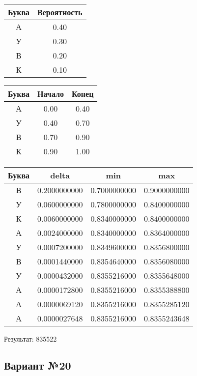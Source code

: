 \documentclass[a4paper, 12pt]{article}
\begin{document}
\begin{center}
 \begin{tabular}{ |c|c| } 
  \hline
     Буква & Вероятность \\ \hline
А & 0.40\\\hline
У & 0.30\\\hline
В & 0.20\\\hline
К & 0.10
\\ \hline \end{tabular}
\end{center}
\begin{center}
 \begin{tabular}{ |c|c|c| } 
  \hline
     Буква & Начало & Конец \\ \hline
А & 0.00 & 0.40\\\hline
У & 0.40 & 0.70\\\hline
В & 0.70 & 0.90\\\hline
К & 0.90 & 1.00
\\ \hline \end{tabular}
\end{center}
\begin{center}
 \begin{tabular}{ |c|c|c|c| } 
  \hline
     Буква & delta & min & max \\ \hline
В & 0.2000000000 & 0.7000000000 & 0.9000000000\\\hline
У & 0.0600000000 & 0.7800000000 & 0.8400000000\\\hline
К & 0.0060000000 & 0.8340000000 & 0.8400000000\\\hline
А & 0.0024000000 & 0.8340000000 & 0.8364000000\\\hline
У & 0.0007200000 & 0.8349600000 & 0.8356800000\\\hline
В & 0.0001440000 & 0.8354640000 & 0.8356080000\\\hline
У & 0.0000432000 & 0.8355216000 & 0.8355648000\\\hline
А & 0.0000172800 & 0.8355216000 & 0.8355388800\\\hline
А & 0.0000069120 & 0.8355216000 & 0.8355285120\\\hline
А & 0.0000027648 & 0.8355216000 & 0.8355243648
\\ \hline \end{tabular}
\end{center}
Результат: 835522
\pagebreak
\subsection{Вариант №20}
\end{document}
